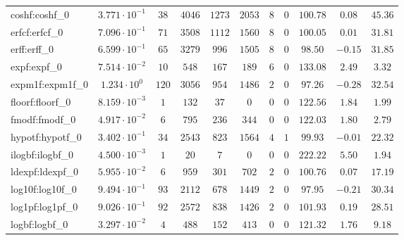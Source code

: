 \begin{tabular}{|l|c|c|c|c|c|c|c|c|c|c|}
coshf:coshf\_0               & $ 3.771 \cdot 10^{-1} $ & $ 38     $ & $ 4046  $ & $ 1273  $ & $ 2053  $ & $ 8   $ & $ 0 $ & $ 100.78      $ & $ 0.08    $ & $ 45.36   $ \\
erfcf:erfcf\_0               & $ 7.096 \cdot 10^{-1} $ & $ 71     $ & $ 3508  $ & $ 1112  $ & $ 1560  $ & $ 8   $ & $ 0 $ & $ 100.05      $ & $ 0.01    $ & $ 31.81   $ \\
erff:erff\_0                 & $ 6.599 \cdot 10^{-1} $ & $ 65     $ & $ 3279  $ & $ 996   $ & $ 1505  $ & $ 8   $ & $ 0 $ & $ 98.50       $ & $ -0.15   $ & $ 31.85   $ \\
expf:expf\_0                 & $ 7.514 \cdot 10^{-2} $ & $ 10     $ & $ 548   $ & $ 167   $ & $ 189   $ & $ 6   $ & $ 0 $ & $ 133.08      $ & $ 2.49    $ & $ 3.32    $ \\
expm1f:expm1f\_0             & $ 1.234 \cdot 10^{0}  $ & $ 120    $ & $ 3056  $ & $ 954   $ & $ 1486  $ & $ 2   $ & $ 0 $ & $ 97.26       $ & $ -0.28   $ & $ 32.54   $ \\
floorf:floorf\_0             & $ 8.159 \cdot 10^{-3} $ & $ 1      $ & $ 132   $ & $ 37    $ & $ 0     $ & $ 0   $ & $ 0 $ & $ 122.56      $ & $ 1.84    $ & $ 1.99    $ \\
fmodf:fmodf\_0               & $ 4.917 \cdot 10^{-2} $ & $ 6      $ & $ 795   $ & $ 236   $ & $ 344   $ & $ 0   $ & $ 0 $ & $ 122.03      $ & $ 1.80    $ & $ 2.79    $ \\
hypotf:hypotf\_0             & $ 3.402 \cdot 10^{-1} $ & $ 34     $ & $ 2543  $ & $ 823   $ & $ 1564  $ & $ 4   $ & $ 1 $ & $ 99.93       $ & $ -0.01   $ & $ 22.32   $ \\
ilogbf:ilogbf\_0             & $ 4.500 \cdot 10^{-3} $ & $ 1      $ & $ 20    $ & $ 7     $ & $ 0     $ & $ 0   $ & $ 0 $ & $ 222.22      $ & $ 5.50    $ & $ 1.94    $ \\
ldexpf:ldexpf\_0             & $ 5.955 \cdot 10^{-2} $ & $ 6      $ & $ 959   $ & $ 301   $ & $ 702   $ & $ 2   $ & $ 0 $ & $ 100.76      $ & $ 0.07    $ & $ 17.19   $ \\
log10f:log10f\_0             & $ 9.494 \cdot 10^{-1} $ & $ 93     $ & $ 2112  $ & $ 678   $ & $ 1449  $ & $ 2   $ & $ 0 $ & $ 97.95       $ & $ -0.21   $ & $ 30.34   $ \\
log1pf:log1pf\_0             & $ 9.026 \cdot 10^{-1} $ & $ 92     $ & $ 2572  $ & $ 838   $ & $ 1426  $ & $ 2   $ & $ 0 $ & $ 101.93      $ & $ 0.19    $ & $ 28.51   $ \\
logbf:logbf\_0               & $ 3.297 \cdot 10^{-2} $ & $ 4      $ & $ 488   $ & $ 152   $ & $ 413   $ & $ 0   $ & $ 0 $ & $ 121.32      $ & $ 1.76    $ & $ 9.18    $ \\

\end{tabular}
